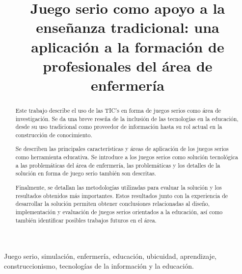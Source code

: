 \documentclass[conference]{util/IEEEtran}
\begin{document}



\title{Juego serio como apoyo a la enseñanza tradicional:  una
	aplicación a la formación de profesionales del área de enfermería}

\author{
\and
{}
}

\maketitle
\thispagestyle{plain}


\begin{abstract}

Este trabajo describe el uso de las TIC's en forma de juegos serios como área de
investigación. Se da una breve reseña de la inclusión de las tecnologías en la
educación, desde su uso tradicional como proveedor de información hasta su rol
actual en la construcción de conocimiento. 

Se describen las principales características y áreas de
aplicación de los juegos serios como herramienta educativa. Se
introduce a los juegos serios como solución tecnológica a las problemáticas del área de
enfermería, las problemáticas y los detalles de la solución en forma de juego
serio también son descritas.

Finalmente, se detallan las metodologías utilizadas para evaluar la solución y
los resultados obtenidos más importantes. Estos resultados junto con la
experiencia de desarrollar la solución permiten obtener conclusiones
relacionadas al diseño, implementación y evaluación  de juegos serios orientados
a la educación, así como también identificar posibles trabajos futuros en el
área.


\end{abstract}

\begin{IEEEkeywords}
    Juego serio, simulación, enfermería, educación, ubicuidad, aprendizaje, 
    construccionismo, tecnologías de la información y la educación. 
\end{IEEEkeywords}
\end{document}
